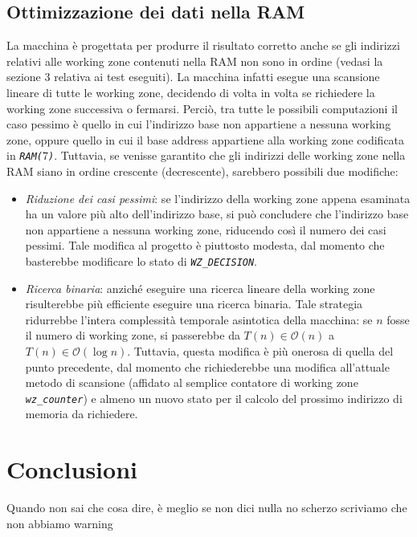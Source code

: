 \documentclass[12pt,a4paper,titlepage]{article}
\begin{document}
		\subsection{Ottimizzazione dei dati nella RAM}
			La macchina è progettata per produrre il risultato corretto anche se gli indirizzi relativi alle working zone contenuti nella RAM non sono in ordine (vedasi la sezione 3 relativa ai test eseguiti). La macchina infatti esegue una scansione lineare di tutte le working zone, decidendo di volta in volta se richiedere la working zone successiva o fermarsi. Perciò, tra tutte le possibili computazioni il caso pessimo è quello in cui l'indirizzo base non appartiene a nessuna working zone, oppure quello in cui il base address appartiene alla working zone codificata in \textit{\texttt{RAM($7$)}}.
			Tuttavia, se venisse garantito che gli indirizzi delle working zone nella RAM siano in ordine crescente (decrescente), sarebbero possibili due modifiche:
			\begin{itemize}
			\item \textit{Riduzione dei casi pessimi}: se l'indirizzo della working zone appena esaminata ha un valore più alto dell'indirizzo base, si può concludere che l'indirizzo base non appartiene a nessuna working zone, riducendo così il numero dei casi pessimi. Tale modifica al progetto è piuttosto modesta, dal momento che basterebbe modificare lo stato di \textit{\texttt{WZ\_DECISION}}.
			\item \textit{Ricerca binaria}: anziché eseguire una ricerca lineare della working zone risulterebbe più efficiente eseguire una ricerca binaria. Tale strategia ridurrebbe l'intera complessità temporale asintotica della macchina: se $n$ fosse il numero di working zone, si passerebbe da $T(n) \in \mathcal{O}(n)$ a $T(n) \in \mathcal{O}(\log n)$. Tuttavia, questa modifica è più onerosa di quella del punto precedente, dal momento che richiederebbe una modifica all'attuale metodo di scansione (affidato al semplice contatore di working zone \textit{\texttt{wz\_counter}}) e almeno un nuovo stato per il calcolo del prossimo indirizzo di memoria da richiedere.
			\end{itemize}
		\section{Conclusioni}
			Quando non sai che cosa dire, è meglio se non dici nulla
				\newline \newline \newline no scherzo scriviamo che non abbiamo warning
		
\end{document}
